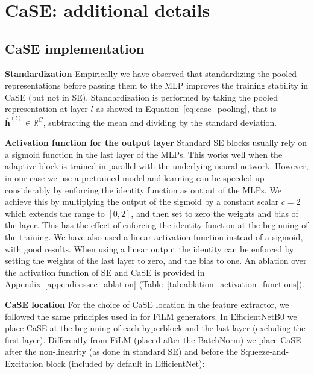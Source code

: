 \documentclass{article}
\begin{document}
\section{CaSE: additional details} \label{appendix:sec_case_details}

\subsection{CaSE implementation} \label{appendix:ssec_techincal_details_case}

\textbf{Standardization} Empirically we have observed that standardizing the pooled representations before passing them to the MLP improves the training stability in CaSE (but not in SE). Standardization is performed by taking the pooled representation at layer $l$ as showed in Equation~\eqref{eq:case_pooling}, that is $\mathbf{\bar{h}}^{(l)} \in \mathbb{R}^{C}$, subtracting the mean and dividing by the standard deviation. 

\textbf{Activation function for the output layer} Standard SE blocks usually rely on a sigmoid function in the last layer of the MLPs. This works well when the adaptive block is trained in parallel with the underlying neural network. However, in our case we use a pretrained model and learning can be speeded up considerably by enforcing the identity function as output of the MLPs. We achieve this by multiplying the output of the sigmoid by a constant scalar $c=2$ which extends the range to $[0, 2]$, and then set to zero the weights and bias of the layer. This has the effect of enforcing the identity function at the beginning of the training. We have also used a linear activation function instead of a sigmoid, with good results. When using a linear output the identity can be enforced by setting the weights of the last layer to zero, and the bias to one.
An ablation over the activation function of SE and CaSE is provided in Appendix~\ref{appendix:ssec_ablation} (Table~\ref{tab:ablation_activation_functions}).


\textbf{CaSE location} For the choice of CaSE location in the feature extractor, we followed the same principles used in \cite{bronskill2021memory} for FiLM generators. In EfficientNetB0 we place CaSE at the beginning of each hyperblock and the last layer (excluding the first layer). Differently from FiLM (placed after the BatchNorm) we place CaSE after the non-linearity (as done in standard SE) and before the Squeeze-and-Excitation block (included by default in EfficientNet):
\end{document}
